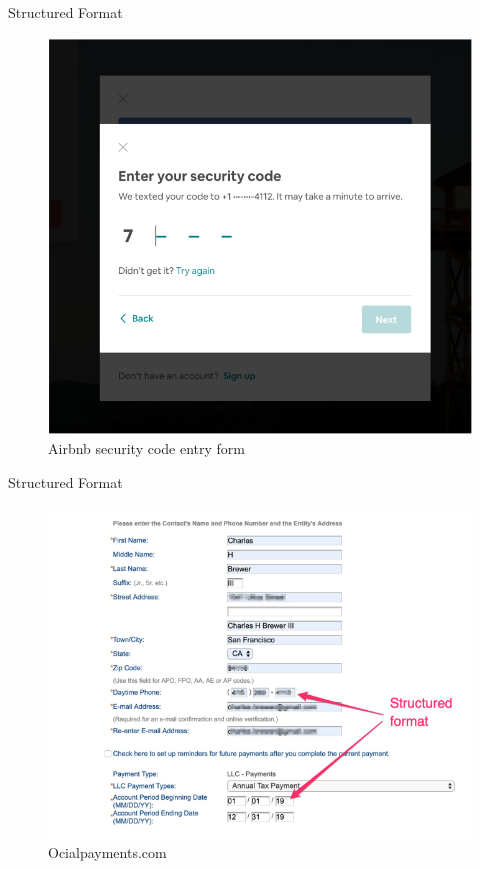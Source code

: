 \documentclass{beamer}
\begin{document}
\begin{frame}[t]{Structured Format}
	\begin{figure}[h]
		\centering
		\includegraphics[scale=0.6]{images/lec08-pic35.png}
		\caption{Airbnb security code entry form}
	\end{figure}
\end{frame}

\begin{frame}[t]{Structured Format}
	\begin{figure}[h]
		\centering
		\includegraphics[scale=0.6]{images/lec08-pic36.png}
		\caption{Ocialpayments.com}
	\end{figure}
\end{frame}
\end{document}
